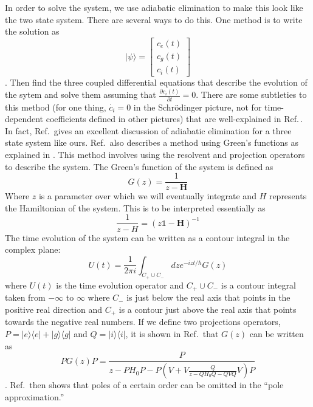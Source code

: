 In order to solve the system, we use adiabatic elimination to make this look like the two state system. There are several ways to do this. One method is to write the solution as 
\begin{equation} 
|\psi\rangle = 
\begin{bmatrix}c_e(t)\\c_g(t)\\c_i(t)
\end{bmatrix}
\end{equation}.
Then find the three coupled differential equations that describe the evolution of the sytem and solve them assuming that $\frac{\partial c_i(t)}{\partial t}=0$. There are some subtleties to this method (for one thing, $\dot{c_i}=0$ in the Schr\"odinger picture, not for time-dependent coefficients defined in other pictures) that are well-explained in Ref.\,\cite{brionLambdaAdiabatic}. In fact, Ref.\,\cite{brionLambdaAdiabatic} gives an excellent discussion of adiabatic elimination for a three state system like ours. 
Ref.\,\cite{brionLambdaAdiabatic} also describes a method using Green's functions as explained in \cite{cohenTannoudji}. This method involves using the resolvent and projection operators to describe the system. The Green's function of the system is defined as 
\begin{equation}
G(z)=\frac{1}{z-\mathbf{H}}
\end{equation}
Where $z$ is a parameter over which we will eventually integrate and $H$ represents the Hamiltonian of the system. This is to be interpreted essentially as 
\begin{equation}
\frac{1}{z-H}=\left(z\mathds{1}-\mathbf{H}\right)^{-1}
\end{equation}
The time evolution of the system can be written as a contour integral in the complex plane:
\begin{equation}
U(t)=\frac{1}{2\pi i}\int_{C_+\cup C_-}dz e^{-izt/\hbar}G(z)
\end{equation}
where $U(t)$ is the time evolution operator and $C_+\cup C_-$ is a contour integral taken from $-\infty$ to $\infty$ where $C_-$ is just below the real axis that points in the positive real direction and $C_+$ is a contour just above the real axis that points towards the negative real numbers. 
If we define two projections operators, $P=|e\rangle\langle e| + |g\rangle\langle g|$ and $Q=|i\rangle\langle i|$, it is shown in Ref.\,\cite{cohenTannoudji} that $G(z)$ can be written as 
\begin{equation}
PG(z)P=\frac{P}{z-PH_0P-P\left(V+V\frac{Q}{z-QH_0Q-QVQ}V\right)P}
\end{equation}.
Ref.\,\cite{brionLambdaAdiabatic} then shows that poles of a certain order can be omitted in the ``pole approximation.'' 

